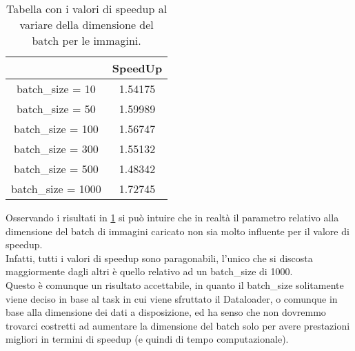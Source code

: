 \documentclass[10pt,twocolumn,letterpaper]{article}
\begin{document}
\begin{table}[h]
\centering
\begin{tabular}{ |c|c| } 
\hline
 & SpeedUp\\
 \hline
batch\_size = 10 & 1.54175\\
\hline
batch\_size = 50 & 1.59989\\
\hline
batch\_size = 100 & 1.56747\\
\hline
batch\_size = 300 & 1.55132\\
\hline
batch\_size = 500 & 1.48342\\
\hline
batch\_size = 1000 & 1.72745\\
\hline
\end{tabular}
\vspace*{3mm}
\caption{Tabella con i valori di speedup al variare della dimensione del batch per le immagini.}
\label{table:t2}
\end{table}

Osservando i risultati in \cref{table:t2} si può intuire che in realtà il parametro relativo alla dimensione del batch di immagini caricato non sia molto influente per il valore di speedup.\\
Infatti, tutti i valori di speedup sono paragonabili, l'unico che si discosta maggiormente dagli altri è quello relativo ad un batch\_size di 1000.\\
Questo è comunque un risultato accettabile, in quanto il batch\_size solitamente viene deciso in base al task in cui viene sfruttato il Dataloader, o comunque in base alla dimensione dei dati a disposizione, ed ha senso che non dovremmo trovarci costretti ad aumentare la dimensione del batch solo per avere prestazioni migliori in termini di speedup (e quindi di tempo computazionale).
\end{document}
